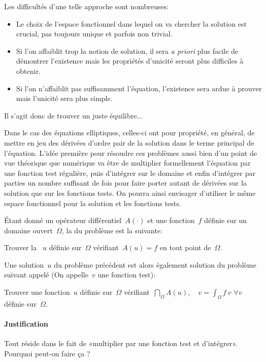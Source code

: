 \medskip
Les difficultés d'une telle approche sont nombreuses:
\begin{itemize}
  \item Le choix de l'espace fonctionnel dans lequel on va chercher la solution est crucial, pas toujours unique et parfois non trivial.
  \item Si l'on affaiblit trop la notion de solution, il sera \emph{a priori} plus facile de démontrer l'existence mais les propriétés d'unicité seront plus difficiles à obtenir.
  \item Si l'on n'affaiblit pas suffisamment l'équation, l'existence sera ardue à prouver mais l'unicité sera plus simple.
\end{itemize}


\medskip
Il s'agit donc de trouver un juste équilibre...

Dans le cas des équations elliptiques, celles-ci ont pour propriété, en général, de mettre en jeu des dérivées d'ordre pair de la solution dans le terme principal de l'équation. L'idée première pour résoudre ces problèmes aussi bien d'un point de vue théorique que numérique va être de multiplier formellement l'équation par une fonction test régulière, puis d'intégrer sur le domaine et enfin d'intégrer par parties un nombre suffisant de fois pour faire porter autant de dérivées sur la solution que sur les fonctions tests. On pourra ainsi envisager d'utiliser le même espace fonctionnel pour la solution et les fonctions tests.

\bigskip
Étant donné un opérateur différentiel~$A(\cdot)$ et une fonction~$f$ définie sur un domaine ouvert~$\Omega$, la  du problème est la suivante:
\begin{center}
  Trouver la ~$u$ définie sur~$\Omega$ vérifiant~$A(u)=f$ en tout point de~$\Omega$.
\end{center}

\medskip
Une solution~$u$ du problème précédent est alors également solution du problème suivant
appelé  (On appelle~$v$ une fonction test):
\begin{center}
  Trouver une fonction~$u$ définie sur~$\Omega$ vérifiant~$\dint_\Omega A(u),\quad v = \int_\Omega f\ v$
$\forall v$ définie sur~$\Omega$.
\end{center}


%
\paragraph{Justification}
Tout réside dans le fait de «multiplier par une fonction test et d'intégrer».
Pourquoi peut-on faire ça ?

